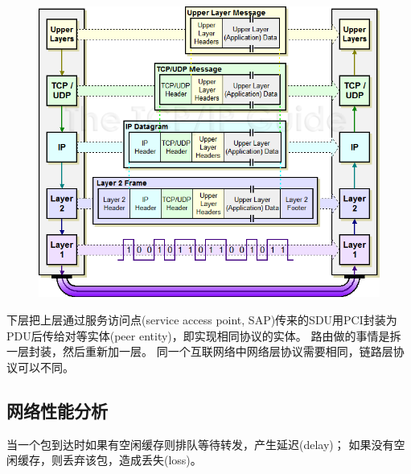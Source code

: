 \begin{minipage}{0.4\linewidth}
\begin{center}
\end{center}
\end{minipage}
\begin{minipage}{0.6\linewidth}
\begin{figure}[H]
	\centering
	\includegraphics[width=\linewidth]{fig/ipencap.png}
\end{figure}
\end{minipage}

\bigskip
下层把上层通过服务访问点(service access point, SAP)传来的SDU用PCI封装为PDU后传给对等实体(peer entity)，即实现相同协议的实体。
路由做的事情是拆一层封装，然后重新加一层。
同一个互联网络中网络层协议需要相同，链路层协议可以不同。

\subsection{网络性能分析}
当一个包到达时如果有空闲缓存则排队等待转发，产生延迟(delay)；
如果没有空闲缓存，则丢弃该包，造成丢失(loss)。

